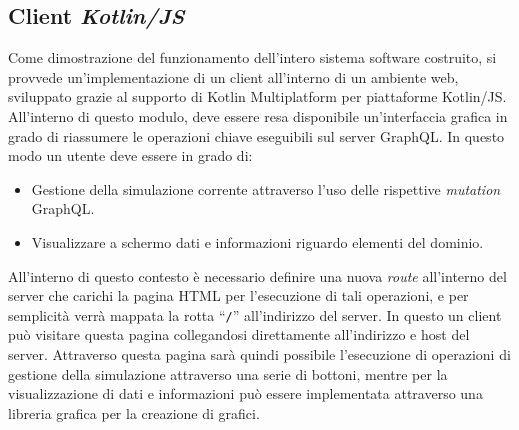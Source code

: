 \subsection{Client \textit{Kotlin/JS}}\label{ssec:kt-js-client}
Come dimostrazione del funzionamento dell'intero sistema software costruito, si provvede un'implementazione di un client all'interno di un ambiente web, sviluppato grazie
al supporto di Kotlin Multiplatform per piattaforme Kotlin/JS. All'interno di questo modulo, deve essere resa disponibile un'interfaccia grafica in grado di riassumere
le operazioni chiave eseguibili sul server GraphQL. In questo modo un utente deve essere in grado di:
\begin{itemize}
    \item Gestione della simulazione corrente attraverso l'uso delle rispettive \textit{mutation} GraphQL.
    \item Visualizzare a schermo dati e informazioni riguardo elementi del dominio.
\end{itemize}

All'interno di questo contesto è necessario definire una nuova \textit{route} all'interno del server che carichi la pagina HTML per l'esecuzione di tali operazioni, e per
semplicità verrà mappata la rotta ``\texttt{/}'' all'indirizzo del server. In questo un client può visitare questa pagina collegandosi direttamente all'indirizzo e host del server.
Attraverso questa pagina sarà quindi possibile l'esecuzione di operazioni di gestione della simulazione attraverso una serie di bottoni, mentre per la visualizzazione di dati e
informazioni può essere implementata attraverso una libreria grafica per la creazione di grafici.

